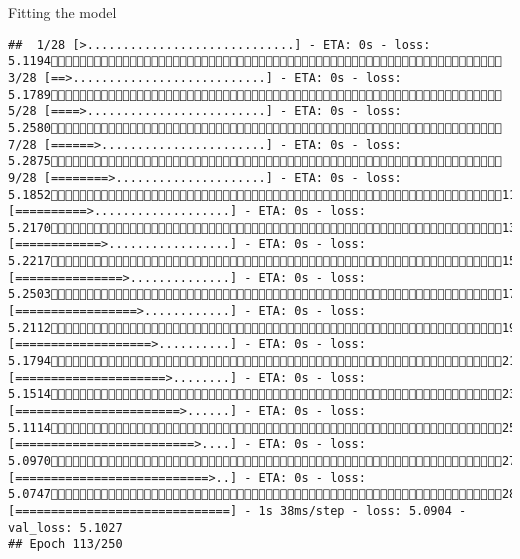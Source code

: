 \documentclass[
  ignorenonframetext,
]{beamer}
\begin{document}
\begin{frame}[fragile]{Fitting the model}
\begin{verbatim}
##  1/28 [>.............................] - ETA: 0s - loss: 5.1194 3/28 [==>...........................] - ETA: 0s - loss: 5.1789 5/28 [====>.........................] - ETA: 0s - loss: 5.2580 7/28 [======>.......................] - ETA: 0s - loss: 5.2875 9/28 [========>.....................] - ETA: 0s - loss: 5.185211/28 [==========>...................] - ETA: 0s - loss: 5.217013/28 [============>.................] - ETA: 0s - loss: 5.221715/28 [===============>..............] - ETA: 0s - loss: 5.250317/28 [=================>............] - ETA: 0s - loss: 5.211219/28 [===================>..........] - ETA: 0s - loss: 5.179421/28 [=====================>........] - ETA: 0s - loss: 5.151423/28 [=======================>......] - ETA: 0s - loss: 5.111425/28 [=========================>....] - ETA: 0s - loss: 5.097027/28 [===========================>..] - ETA: 0s - loss: 5.074728/28 [==============================] - 1s 38ms/step - loss: 5.0904 - val_loss: 5.1027
## Epoch 113/250

\end{verbatim}
\end{frame}
\end{document}
